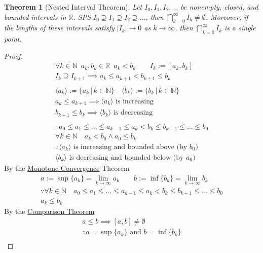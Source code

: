 \documentclass[11pt, oneside]{book}
\theoremstyle{break}
\newtheorem{thm}{Theorem}[section]
\newtheorem*{proof}{Proof}
\newcommand{\bb}[1]{\mathbb{#1}}			%
\begin{document}
\begin{thm}[Nested Interval Theorem]
	Let $I_0, I_1, I_2, ...$ be nonempty, closed, and bounded intervals in $\bb{R}$. SPS $I_0 \supseteq I_1 \supseteq I_2 \supseteq \hdots$, then $\bigcap_{k = 0}^\infty I_k \neq \emptyset$. Moreover, if the lengths of these intervals satisfy $|I_k| \to 0$ as $k \to \infty$, then $\bigcap_{k = 0}^\infty I_k$ is a single point.
\end{thm}

\begin{proof}
	\begin{gather*}
		\forall k \in \bb{N} \enspace a_k, b_k \in \bb{R} \enspace a_k < b_k \qquad I_k := [a_k, b_k] \\
		I_k \supseteq I_{k + 1} \implies a_k \leq a_{k + 1} < b_{k + 1} \leq b_k \\
		\\
		\langle a_k \rangle := \{a_k \, | \, k \in \bb{N} \} \quad \langle b_k \rangle := \{b_k \, | \, k \in \bb{N} \} \\
		a_k \leq a_{k + 1} \implies \langle a_k \rangle \text{ is increasing} \\
		b_{k + 1} \leq b_k \implies \langle b_k \rangle \text{ is decreasing} \\
		\\
		\because a_0 \leq a_1 \leq \hdots \leq a_{k - 1} \leq a_k < b_k \leq b_{k - 1} \leq \hdots \leq b_0 \\
		\forall k \in \bb{N} \quad a_k < b_0 \land a_0 \leq b_k \\
		\therefore \langle a_k \rangle \text{ is increasing and bounded above (by $b_0$)} \\
		\langle b_k \rangle \text{ is decreasing and bounded below (by $a_0$)}
	\end{gather*}
	By the \hyperref[monotone_convergence]{Monotone Convergence} Theorem
	\begin{gather*}
		a := \sup \{ a_k \} = \lim_{k \to \infty} a_k \qquad b := \inf \{ b_k \} = \lim_{k \to \infty} b_k \\
		\because \forall k \in \bb{N} \quad a_0 \leq a_1 \leq \hdots \leq a_{k - 1} \leq a_k < b_k \leq b_{k - 1} \leq \hdots \leq b_0 \\
		a_k \leq b_k
	\end{gather*}
	By the \hyperref[comparison_seq]{Comparison Theorem}
	\begin{gather*}
		a \leq b \implies [a, b] \neq \emptyset \\
		\because a = \sup \{ a_k \} \text{ and } b = \inf \{ b_k \} \\

\end{gather*}
\end{proof}
\end{document}
